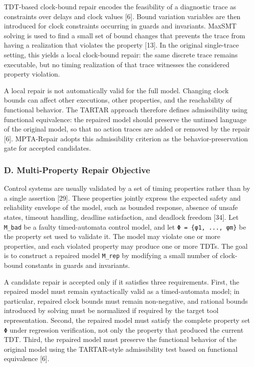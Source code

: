 \documentclass[
]{article}
\begin{document}
TDT-based clock-bound repair encodes the feasibility of a diagnostic
trace as constraints over delays and clock values {[}6{]}. Bound
variation variables are then introduced for clock constraints occurring
in guards and invariants. MaxSMT solving is used to find a small set of
bound changes that prevents the trace from having a realization that
violates the property {[}13{]}. In the original single-trace setting,
this yields a local clock-bound repair: the same discrete trace remains
executable, but no timing realization of that trace witnesses the
considered property violation.

A local repair is not automatically valid for the full model. Changing
clock bounds can affect other executions, other properties, and the
reachability of functional behavior. The TARTAR approach therefore
defines admissibility using functional equivalence: the repaired model
should preserve the untimed language of the original model, so that no
action traces are added or removed by the repair {[}6{]}. MPTA-Repair
adopts this admissibility criterion as the behavior-preservation gate
for accepted candidates.

\subsubsection{D. Multi-Property Repair
Objective}\label{d.-multi-property-repair-objective}

Control systems are usually validated by a set of timing properties
rather than by a single assertion {[}29{]}. These properties jointly
express the expected safety and reliability envelope of the model, such
as bounded response, absence of unsafe states, timeout handling,
deadline satisfaction, and deadlock freedom {[}34{]}. Let
\texttt{M\_bad} be a faulty timed-automata control model, and let
\texttt{Φ\ =\ \{φ1,\ ...,\ φm\}} be the property set used to validate
it. The model may violate one or more properties, and each violated
property may produce one or more TDTs. The goal is to construct a
repaired model \texttt{M\_rep} by modifying a small number of
clock-bound constants in guards and invariants.

A candidate repair is accepted only if it satisfies three requirements.
First, the repaired model must remain syntactically valid as a
timed-automata model; in particular, repaired clock bounds must remain
non-negative, and rational bounds introduced by solving must be
normalized if required by the target tool representation. Second, the
repaired model must satisfy the complete property set \texttt{Φ} under
regression verification, not only the property that produced the current
TDT. Third, the repaired model must preserve the functional behavior of
the original model using the TARTAR-style admissibility test based on
functional equivalence {[}6{]}.
\end{document}
